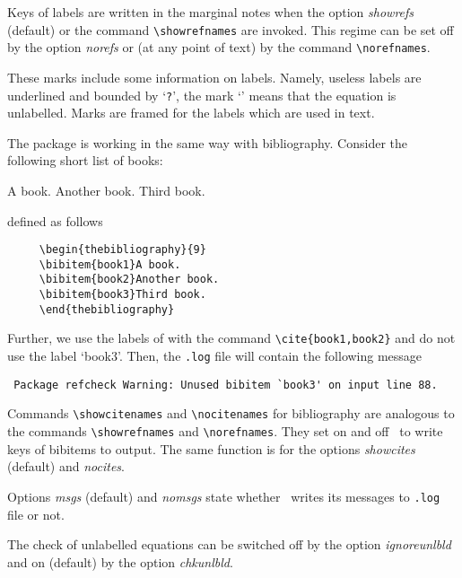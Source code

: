 \documentclass[11pt]{article}
\begin{document}
Keys of labels are written in the marginal notes when the option
\textit{showrefs\/} (default) or the command \verb#\showrefnames# are
invoked. This regime can be set off by the option \textit{norefs} or (at
any point of text) by the command \verb#\norefnames#.

These marks include some information on labels.  Namely, useless
labels are underlined and bounded by `\texttt{?}', the mark `\unl@bld@mark'
means that the equation is unlabelled.  Marks are framed for
the labels which are used in text.

\newpage

The package is working in the same way with bibliography.
Consider the following short list of books:

\vspace{-1\baselineskip}

\begin{thebibliography}{9}
 A book.
 Another book.
 Third book.
\end{thebibliography}
defined as follows
\begin{verbatim}
     \begin{thebibliography}{9}
     \bibitem{book1}A book.
     \bibitem{book2}Another book.
     \bibitem{book3}Third book.
     \end{thebibliography}
\end{verbatim}
Further, we use the labels of \cite{book1,book2} with the
command \verb#\cite{book1,book2}# and do not use the label
`book3'. Then, the \texttt{.log} file will contain the following message
{\small
\begin{verbatim}
 Package refcheck Warning: Unused bibitem `book3' on input line 88.
\end{verbatim}}

Commands \verb#\showcitenames# and \verb#\nocitenames# for
bibliography are analogous to the commands \verb#\showrefnames# and
\verb#\norefnames#.  They set on and off \RefCheck\ to write keys of
bibitems to output.  The same function is for the options
\textit{showcites\/} (default) and \textit{nocites}.

Options \textit{msgs\/} (default) and \textit{nomsgs\/} state whether
\RefCheck\ writes its messages to \texttt{.log} file or not.

The check of unlabelled equations can be switched off by the option
\mbox{\textit{ignoreunlbld\/}} and on (default) by the option
\textit{chkunlbld\/}.

\medskip
\end{document}
